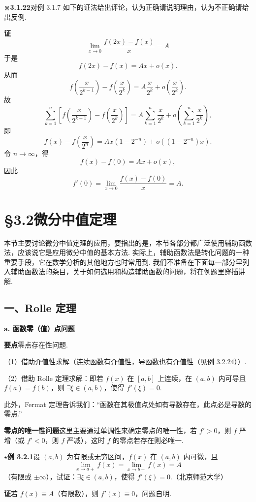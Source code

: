 \documentclass[UTF8,12pt,a4paper,fontset=fandol]{ctexart}
\begin{document}
\noindent\textbf{※3.1.22}\quad 对例 3.1.7 如下的证法给出评论，认为正确请说明理由，认为不正确请给出反例.

\noindent\textbf{证}\quad
\[
  \lim_{x\to0}\frac{f(2x)-f(x)}{x}=A
\]
于是
\[
  f(2x)-f(x)=Ax+o(x).
\]
从而
\[
  f\left(\frac{x}{2^{k-1}}\right)-f\left(\frac{x}{2^k}\right)
  =A\frac{x}{2^k}+o\left(\frac{x}{2^k}\right).
\]
故
\[
  \sum_{k=1}^n\left[
  f\left(\frac{x}{2^{k-1}}\right)-f\left(\frac{x}{2^k}\right)\right]
  =A\sum_{k=1}^n\frac{x}{2^k}+o\left(\sum_{k=1}^n\frac{x}{2^k}\right),
\]
即
\[
  f(x)-f\left(\frac{x}{2^n}\right)
  =Ax(1-2^{-n})+o((1-2^{-n})x).
\]
令 $n\to\infty$，得
\[
  f(x)-f(0)=Ax+o(x),
\]
因此
\[
  f'(0)=\lim_{x\to0}\frac{f(x)-f(0)}{x}=A.
\]

\section*{§3.2\quad 微分中值定理}

本节主要讨论微分中值定理的应用，要指出的是，本节各部分都广泛使用辅助函数法，应该说它是应用微分中值的基本方法. 实际上，辅助函数法是转化问题的一种重要手段，它在数学分析的其他地方也时常用到. 我们不准备在下面每一部分里列入辅助函数法的条目，关于如何选用和构造辅助函数的问题，将在例题里穿插讲解.

\subsection*{一、Rolle 定理}

\noindent\textbf{a. 函数零（值）点问题}

\noindent\textbf{要点}\quad 零点存在性问题.

（1）借助介值性求解（连续函数有介值性，导函数也有介值性（见例 3.2.24））.

（2）借助 Rolle 定理求解：即若 $f(x)$ 在 $[a,b]$ 上连续，在 $(a,b)$ 内可导且 $f(a)=f(b)$，则 $\exists\xi\in(a,b)$，使得 $f'(\xi)=0$.

此外，Fermat 定理告诉我们：“函数在其极值点处如有导数存在，此点必是导数的零点.”

\noindent\textbf{零点的唯一性问题}\quad 这里主要通过单调性来确定零点的唯一性，若 $f'>0$，则 $f$ 严增（或 $f'<0$，则 $f$ 严减），这时 $f$ 的零点若存在则必唯一.

\noindent\textbf{$\star$例 3.2.1}\quad 设 $(a,b)$ 为有限或无穷区间，$f(x)$ 在 $(a,b)$ 内可微，且
\[
  \lim_{x\to a+}f(x)=\lim_{x\to b-}f(x)=A
\]
（有限或 $\pm\infty$），试证：$\exists\xi\in(a,b)$，使得 $f'(\xi)=0$.（北京师范大学）

\noindent\textbf{证}\quad 若 $f(x)\equiv A$（有限数），则 $f'(x)\equiv0$，问题自明.
\end{document}
